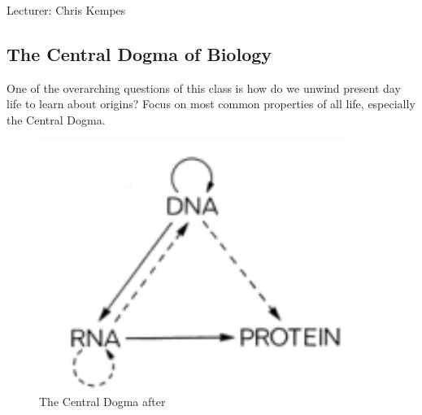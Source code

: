 \documentclass[]{article}
\begin{document}
Lecturer: Chris Kempes

\subsection{The Central Dogma of Biology}

One of the overarching questions of this class is how do we unwind present day life to learn about origins? Focus on most common properties of all life, especially the Central Dogma.\cite{crick1958biological} \cite{crick1970central}

\begin{figure}[H]
	\caption[The Central Dogma]{The Central Dogma after \cite{crick1970central}}\label{fig:CentralDogma} 
	\includegraphics[width=0.9\textwidth]{CentralDogma}
\end{figure}
\end{document}

